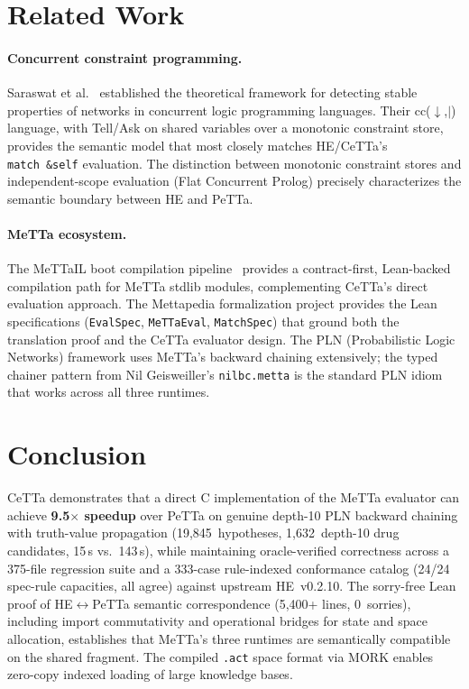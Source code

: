 \documentclass[11pt]{article}
\newcommand{\code}[1]{\texttt{#1}}
\newcommand{\PeTTa}{\textup{PeTTa}}
\newcommand{\HE}{\textup{HE}}
\newcommand{\CeTTa}{\textup{CeTTa}}
\begin{document}
\section{Related Work}

\paragraph{Concurrent constraint programming.}
Saraswat et al.~\cite{saraswat1988} established the theoretical
framework for detecting stable properties of networks in concurrent
logic programming languages.  Their cc($\downarrow$,$|$) language,
with Tell/Ask on shared variables over a monotonic constraint store,
provides the semantic model that most closely matches \HE{}/\CeTTa{}'s
\code{match~\&self} evaluation.  The distinction between monotonic
constraint stores and independent-scope evaluation (Flat Concurrent
Prolog) precisely characterizes the semantic boundary between \HE{} and
\PeTTa{}.

\paragraph{MeTTa ecosystem.}
The MeTTaIL boot compilation pipeline~\cite{mettail} provides a
contract-first, Lean-backed compilation path for MeTTa stdlib modules,
complementing \CeTTa{}'s direct evaluation approach.  The Mettapedia
formalization project provides the Lean specifications (\code{EvalSpec},
\code{MeTTaEval}, \code{MatchSpec}) that ground both the translation
proof and the \CeTTa{} evaluator design.  The PLN (Probabilistic Logic
Networks) framework uses MeTTa's backward chaining extensively; the
typed chainer pattern from Nil Geisweiller's \code{nilbc.metta} is
the standard PLN idiom that works across all three runtimes.

\section{Conclusion}

\CeTTa{} demonstrates that a direct C implementation of the MeTTa
evaluator can achieve \textbf{9.5$\times$ speedup} over \PeTTa{} on
genuine depth-10 PLN backward chaining with truth-value propagation
(19{,}845~hypotheses, 1{,}632~depth-10 drug candidates, 15\,s vs.\
143\,s), while maintaining oracle-verified correctness across a
375-file regression suite and a 333-case rule-indexed conformance
catalog (24/24 spec-rule capacities, all agree) against upstream
\HE{}~v0.2.10.
The sorry-free Lean proof of \HE{}$\leftrightarrow$\PeTTa{} semantic
correspondence (5{,}400+ lines, 0~sorries), including import
commutativity and operational bridges for state and space allocation,
establishes that MeTTa's three runtimes are semantically compatible
on the shared fragment.  The compiled \code{.act} space format via
MORK enables zero-copy indexed loading of large knowledge bases.
\end{document}
